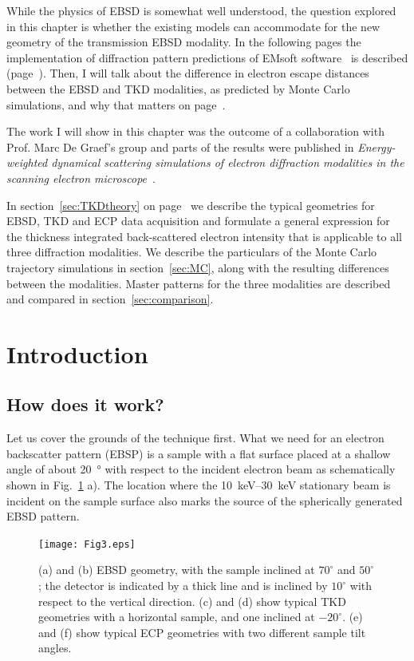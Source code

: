While the physics of EBSD is somewhat well understood, the question explored in this chapter is whether the existing models can accommodate for the new geometry of the transmission EBSD modality. In the following pages the implementation of diffraction pattern predictions of EMsoft software~\cite{EMsoftpaper} is described (page~\pageref{sec:TKDtheory}). Then, I will talk about the difference in electron escape distances between the EBSD and TKD modalities, as predicted by Monte Carlo simulations, and why that matters on page~\pageref{sec:MC}. 


The work I will show in this chapter was the outcome of a collaboration with Prof. Marc De Graef's group and parts of the results were published in \textit{Energy-weighted dynamical scattering simulations of electron diffraction modalities in the scanning electron microscope}~\cite{PascalTKD}.

In section~\ref{sec:TKDtheory} on page~\pageref{sec:TKDtheory} we describe the typical geometries for EBSD, TKD and ECP data acquisition and formulate a general expression for the thickness integrated back-scattered electron intensity that is applicable to all three diffraction modalities. We describe the particulars of the Monte Carlo trajectory simulations in section~\ref{sec:MC}, along with the resulting differences between the modalities. Master patterns for the three modalities are described and compared in section~\ref{sec:comparison}. 



\section{Introduction}

\subsection{How does it work?}
\label{sec:EBSD}

Let us cover the grounds of the technique first. What we need for an electron backscatter pattern (EBSP) is a sample with a flat surface placed at a shallow angle of about \SI{20}{\degree} with respect to the incident electron  beam as schematically shown in Fig.~\ref{fig:geometries} a). The location where the \SIrange{10}{30}{\kilo \electronvolt} stationary beam is incident on  the sample surface also marks the source of the spherically generated EBSD pattern. 

\begin{figure}[ht]
\centering
\texttt{[image: Fig3.eps]}
\caption[EBSD, TKD and ECP set-up geometry.]{(a) and (b) EBSD geometry, with the sample inclined at $70^{\circ}$ and $50^{\circ}$; the detector is indicated by a thick line and is inclined by $10^{\circ}$ with respect to the vertical direction. (c) and (d) show typical TKD geometries with a horizontal sample, and one inclined at $-20^{\circ}$. (e) and (f) show typical ECP geometries with two different sample tilt angles.}
\label{fig:geometries}
\end{figure}

